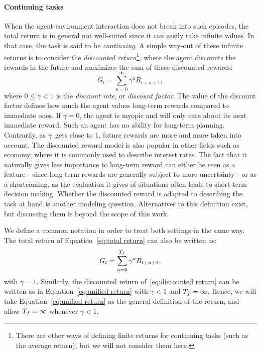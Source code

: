 				\paragraph{Continuing tasks} When the agent-environment interaction does not break into such episodes, the total return is in general not well-suited since it can easily take infinite values. In that case, the task is said to be\emph{ continuing}. A simple way-out of these infinite returns is to consider the\emph{ discounted return}\footnote{There are other ways of defining finite returns for continuing tasks (such as the average return), but we will not consider them here.}, where the agent discounts the rewards in the future and maximizes the sum of these discounted rewards:
				\begin{equation}
					G_t = \sum_{u=0}^\infty \gamma^u R_{t + u + 1}, \label{eq:discounted return}
				\end{equation}
				where $0 \leq \gamma < 1$ is the\emph{ discount rate}, or\emph{ discount factor}. The value of the discount factor defines how much the agent values long-term rewards compared to immediate ones. If $\gamma = 0$, the agent is myopic and will only care about its next immediate reward. Such an agent has no ability for long-term planning. Contrarily, as $\gamma$~gets close to 1, future rewards are more and more taken into account. The discounted reward model is also popular in other fields such as economy, where it is commonly used to describe interest rates. The fact that it naturally gives less importance to long-term reward can either be seen as a feature - since long-term rewards are generally subject to more uncertainty - or as a shortcoming, as the evaluation it gives of situations often leads to short-term decision making. Whether the discounted reward is adapted to describing the task at hand is another modeling question. Alternatives to this definition exist, but discussing them is beyond the scope of this work.\par
				We define a common notation in order to treat both settings in the same way. The total return of Equation~\eqref{eq:total return} can also be written as:
			\begin{equation}
				G_t = \sum_{u=0}^{{T_f}} \gamma^u R_{t + u + 1}, \label{eq:unified return}
			\end{equation}
			with $\gamma = 1$. Similarly, the discounted return of~\eqref{eq:discounted return} can be written as in Equation~\eqref{eq:unified return} with $\gamma < 1$ and ${T_f} = \infty$. Hence, we will take Equation~\eqref{eq:unified return} as the general definition of the return, and allow ${T_f} = \infty$ whenever $\gamma < 1$.
